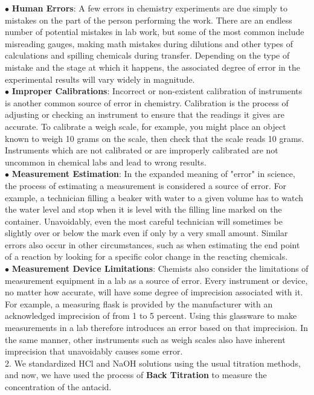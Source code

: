 \documentclass[12pt]{article}
\begin{document}
	$\bullet$ \textbf{Human Errors}: A few errors in chemistry experiments are due simply to mistakes on the part of the person performing the work. There are an endless number of potential mistakes in lab work, but some of the most common include misreading gauges, making math mistakes during dilutions and other types of calculations and spilling chemicals during transfer. Depending on the type of mistake and the stage at which it happens, the associated degree of error in the experimental results will vary widely in magnitude.\\
	$\bullet$ \textbf{Improper Calibrations}: Incorrect or non-existent calibration of instruments is another common source of error in chemistry. Calibration is the process of adjusting or checking an instrument to ensure that the readings it gives are accurate. To calibrate a weigh scale, for example, you might place an object known to weigh 10 grams on the scale, then check that the scale reads 10 grams. Instruments which are not calibrated or are improperly calibrated are not uncommon in chemical labs and lead to wrong results.\\
	$\bullet$ \textbf{Measurement Estimation}: In the expanded meaning of "error" in science, the process of estimating a measurement is considered a source of error. For example, a technician filling a beaker with water to a given volume has to watch the water level and stop when it is level with the filling line marked on the container. Unavoidably, even the most careful technician will sometimes be slightly over or below the mark even if only by a very small amount. Similar errors also occur in other circumstances, such as when estimating the end point of a reaction by looking for a specific color change in the reacting chemicals.\\
	$\bullet$ \textbf{Measurement Device Limitations}: Chemists also consider the limitations of measurement equipment in a lab as a source of error. Every instrument or device, no matter how accurate, will have some degree of imprecision associated with it. For example, a measuring flask is provided by the manufacturer with an acknowledged imprecision of from 1 to 5 percent. Using this glassware to make measurements in a lab therefore introduces an error based on that imprecision. In the same manner, other instruments such as weigh scales also have inherent imprecision that unavoidably causes some error.\\
	
	2. We standardized HCl and NaOH solutions using the usual titration methods, and now, we have used the process of \textbf{Back Titration} to measure the concentration of the antacid.
	
	
\end{document}

